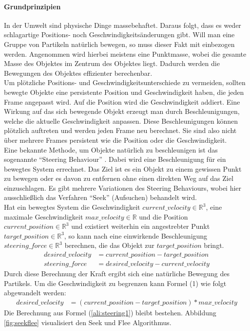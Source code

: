 \documentclass[11pt,a4paper]{article}
\begin{document}
\paragraph{Grundprinzipien}
\label{sec:GrundprinzipienBewegung}
In der Umwelt sind physische Dinge massebehaftet. Daraus folgt, dass es weder schlagartige Positions- noch Geschwindigkeitsänderungen gibt. Will man eine Gruppe von Partikeln natürlich bewegen, so muss dieser Fakt mit einbezogen werden. Angenommen wird hierbei meistens eine Punktmasse, wobei die gesamte Masse des Objektes im Zentrum des Objektes liegt. Dadurch werden die Bewegungen des Objektes effizienter berechenbar.\\
Um plötzliche Positions- und Geschwindigkeitsunterschiede zu vermeiden, sollten bewegte Objekte eine persistente Position und Geschwindigkeit haben, die jeden Frame angepasst wird. Auf die Position wird die Geschwindigkeit addiert. Eine Wirkung auf das sich bewegende Objekt erzeugt man durch Beschleunigungen, welche die aktuelle Geschwindigkeit anpassen. Diese Beschleunigungen können plötzlich auftreten und werden jeden Frame neu berechnet. Sie sind also nicht über mehrere Frames persistent wie die Position oder die Geschwindigkeit.\\
Eine bekannte Methode, um Objekte natürlich zu beschleunigen ist das sogenannte ``Steering Behaviour'' \cite{580abc6c6615ef9f9c16f9069351938a0dda3c5120b7e8d1450d6b1abf0a71df}. Dabei wird eine Beschleunigung für ein bewegtes System errechnet. Das Ziel ist es ein Objekt zu einem gewissen Punkt zu bewegen oder es davon zu entfernen ohne einen direkten Weg auf das Ziel einzuschlagen. Es gibt mehrere Variationen des Steering Behaviours, wobei hier ausschließlich das Verfahren ``Seek'' (Aufsuchen) behandelt wird.\\
Hat ein bewegtes System die Geschwindigkeit $current\_velocity \in \mathbb{R}^3$, eine maximale Geschwindigkeit $max\_velocity \in \mathbb{R}$ und die Position $current\_position \in \mathbb{R}^3$ und existiert weiterhin ein angestrebter Punkt $target\_position \in \mathbb{R}^3$, so kann nach \cite[S. 2]{580abc6c6615ef9f9c16f9069351938a0dda3c5120b7e8d1450d6b1abf0a71df} eine einwirkende Beschleunigung $steering\_force \in \mathbb{R}^3$ berechnen, die das Objekt zur $target\_position$ bringt.
\begin{align}
desired\_velocity &= current\_position - target\_position \\
steering\_force &= desired\_velocity - current\_velocity
\label{ali:steering1}
\end{align}
Durch diese Berechnung der Kraft ergibt sich eine natürliche Bewegung des Partikels.
Um die Geschwindigkeit zu begrenzen kann Formel (1) wie folgt abgewandelt werden:
\begin{align}
desired\_velocity &= (current\_position - target\_position) * max\_velocity
\end{align}
\noindent
Die Berechnung aus Formel (\ref{ali:steering1}) bleibt bestehen. Abbildung \ref{fig:seekflee} visualisiert den Seek und Flee Algorithmus.
\end{document}
